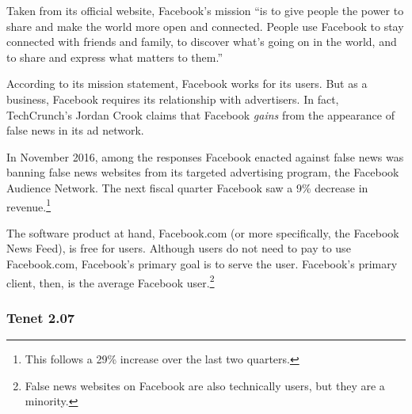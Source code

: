 \par Taken from its official website, Facebook's mission ``is to give people the power to share and make the world more open and connected. People use Facebook to stay connected with friends and family, to discover what’s going on in the world, and to share and express what matters to them.'' \cite{fb_newsroom}
\par According to its mission statement, Facebook works for its users. But as a business, Facebook requires its relationship with advertisers. In fact, TechCrunch's Jordan Crook claims that Facebook \emph{gains} from the appearance of false news in its ad network.  \cite{tc_responsibility}
\par In November 2016, among the responses Facebook enacted against false news was banning false news websites from its targeted advertising program, the Facebook Audience Network. \cite{tc_ban} The next fiscal quarter Facebook saw a 9\% decrease in revenue.\footnote{This follows a 29\% increase over the last two quarters.} \cite{tc_ban,fb_4q2016,fb_1q2017} 
\par The software product at hand, Facebook.com (or more specifically, the Facebook News Feed), is free for users. Although users do not need to pay to use Facebook.com, Facebook's primary goal is to serve the user. Facebook's primary client, then, is the average Facebook user.\footnote{False news websites on Facebook are also technically users, but they are a minority.}

\subsubsection{Tenet 2.07}


\label{issue}

